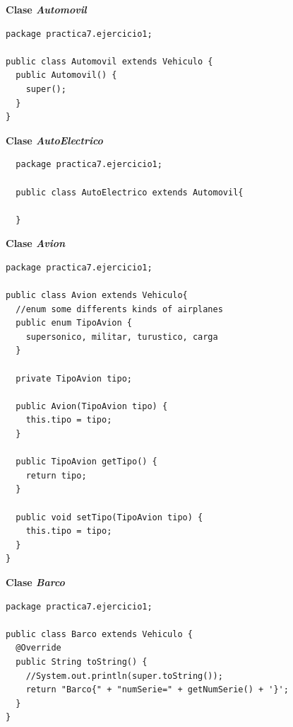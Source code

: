 \documentclass[11pt, twocolumn]{article}
\begin{document}
  \textbf{Clase \textit{Automovil}}
  \begin{lstlisting}
package practica7.ejercicio1;

public class Automovil extends Vehiculo {
  public Automovil() {
    super();
  }
}
  \end{lstlisting}

  \textbf{Clase \textit{AutoElectrico}}
  \begin{lstlisting}
  package practica7.ejercicio1;

  public class AutoElectrico extends Automovil{
      
  }
  \end{lstlisting}

  \textbf{Clase \textit{Avion}}
  \begin{lstlisting}
package practica7.ejercicio1;

public class Avion extends Vehiculo{
  //enum some differents kinds of airplanes
  public enum TipoAvion {
    supersonico, militar, turustico, carga
  }

  private TipoAvion tipo;

  public Avion(TipoAvion tipo) {
    this.tipo = tipo;
  }

  public TipoAvion getTipo() {
    return tipo;
  }

  public void setTipo(TipoAvion tipo) {
    this.tipo = tipo;
  } 
}
  \end{lstlisting}

  \textbf{Clase \textit{Barco}}
  \begin{lstlisting}
package practica7.ejercicio1;

public class Barco extends Vehiculo {
  @Override
  public String toString() {
    //System.out.println(super.toString());
    return "Barco{" + "numSerie=" + getNumSerie() + '}';
  }
}
  \end{lstlisting}
\end{document}
